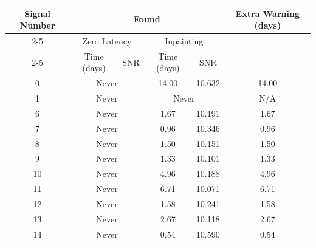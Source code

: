 \begin{tabular}{|c|cc|cc|c|}
\hline
\multirow{3}{*}{Signal Number} & \multicolumn{4}{c|}{Found} & \multirow{3}{*}{Extra Warning (days)} \\
\cline{2-5}
& \multicolumn{2}{c|}{Zero Latency} & \multicolumn{2}{c|}{Inpainting} & \\
\cline{2-5}
 & Time (days)  & SNR & Time (days)  & SNR & \\
\hline
0 & \multicolumn{2}{c|}{Never}    & 14.00 &  10.632 & 14.00 \\
1 & \multicolumn{2}{c|}{Never}    & \multicolumn{2}{c|}{Never}   & N/A \\
6 & \multicolumn{2}{c|}{Never}    & 1.67 &  10.191 & 1.67 \\
7 & \multicolumn{2}{c|}{Never}    & 0.96 &  10.346 & 0.96 \\
8 & \multicolumn{2}{c|}{Never}    & 1.50 &  10.151 & 1.50 \\
9 & \multicolumn{2}{c|}{Never}    & 1.33 &  10.101 & 1.33 \\
10 & \multicolumn{2}{c|}{Never}    & 4.96 &  10.188 & 4.96 \\
11 & \multicolumn{2}{c|}{Never}    & 6.71 &  10.071 & 6.71 \\
12 & \multicolumn{2}{c|}{Never}    & 1.58 &  10.241 & 1.58 \\
13 & \multicolumn{2}{c|}{Never}    & 2.67 &  10.118 & 2.67 \\
14 & \multicolumn{2}{c|}{Never}    & 0.54 &  10.590 & 0.54 \\
\hline
\end{tabular}